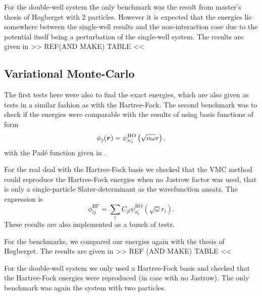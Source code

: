     For the double-well system the only benchmark was the result from master's
    thesis of Høgberget\cite{jorgenThesis} with $2$ particles. However it is
    expected that the energies lie somewhere between the single-well results
    and the non-interaction case due to the potential itself being a
    perturbation of the single-well system. The results are given in >> REF(AND MAKE) TABLE <<

\subsection{Variational Monte-Carlo}
    The first tests here were also to find the exact energies, which are also
    given as tests in a similar fashion as with the Hartree-Fock. The second
    benchmark was to check if the energies were comparable with the results of
    \cite{jorgenThesis} using basis functions of form
        \begin{equation}
            \phi_j(\boldsymbol{{r}}) =
            \psi^{\text{HO}}_{n_j}\left(\sqrt{\alpha\omega}r\right),
        \end{equation}
    with the Pad\'e function given in .

    For the real deal with the Hartree-Fock basis we checked that the VMC
    method could reproduce the Hartree-Fock energies when no Jastrow factor was
    used, that is only a single-particle Slater-determinant  as the wavefunction ansatz. The expression is
        \begin{equation}
            \phi^{\text{HF}}_{ij} = \sum_l C_{jl}
            \psi^{\text{HO}}_{n_l}\left(\sqrt{\omega}r_i\right).
        \end{equation}
    These results are also implemented as a bunch of tests.

    For the benchmarks, we compared our energies again with the thesis of
    Høgberget\cite{jorgenThesis}. The results are given in >> REF (AND MAKE) TABLE <<

    For the double-well system we only used a Hartree-Fock basis and checked
    that the Hartree-Fock energies were reproduced (in case with no Jastrow).
    The only benchmark was again the system with two particles.
